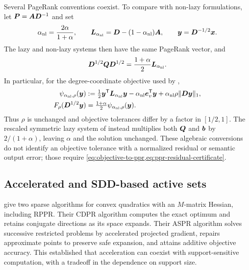 Several PageRank conventions coexist. To compare with non-lazy formulations,
let $\bm{P}=\bm{A}\bm{D}^{-1}$ and set
\begin{equation}
 \alpha_{\mathrm{nl}}=\frac{2\alpha}{1+\alpha},\qquad
 \bm{L}_{\alpha_{\mathrm{nl}}}=\bm{D}-(1-\alpha_{\mathrm{nl}})\bm{A},
 \qquad \bm{y}=\bm{D}^{-1/2}\bm{x}.
 \label{eq:related-nonlazy-map}
\end{equation}
The lazy and non-lazy systems then have the same PageRank vector, and
\begin{equation*}
 \bm{D}^{1/2}\bm{Q}\bm{D}^{1/2}
   =\frac{1+\alpha}{2}\bm{L}_{\alpha_{\mathrm{nl}}}.
\end{equation*}
In particular, for the degree-coordinate objective used by
\citet{wei2026simple,cui2026accelerating},
\begin{equation*}
 \begin{aligned}
 \psi_{\alpha_{\mathrm{nl}},\rho}(\bm{y})
   &:=\tfrac12\bm{y}^{\mathsf{T}}\bm{L}_{\alpha_{\mathrm{nl}}}\bm{y}
      -\alpha_{\mathrm{nl}}\bm{e}_{v}^{\mathsf{T}}\bm{y}
      +\alpha_{\mathrm{nl}}\rho\lVert\bm{D}\bm{y}\rVert_1,\\
 F_\rho(\bm{D}^{1/2}\bm{y})
   &=\tfrac{1+\alpha}{2}\psi_{\alpha_{\mathrm{nl}},\rho}(\bm{y}).
 \end{aligned}
\end{equation*}
Thus $\rho$ is unchanged and objective tolerances differ by a factor in
$[1/2,1]$. The rescaled symmetric lazy system of
\citet{zhou2024iterative} instead multiplies both $\bm{Q}$ and $\bm{b}$ by
$2/(1+\alpha)$, leaving $\alpha$ and the solution unchanged.
These algebraic conversions do not identify an objective tolerance with a
normalized residual or semantic output error; those require
\cref{eq:objective-to-ppr,eq:ppr-residual-certificate}.

\subsection{Accelerated and SDD-based active sets}

\citet{martinezrubio2023accelerated} give two sparse algorithms for convex
quadratics with an $M$-matrix Hessian, including RPPR. Their CDPR algorithm
computes the exact optimum and retains conjugate directions as its space
expands. Their ASPR algorithm solves successive restricted problems by
accelerated projected gradient, repairs approximate points to preserve safe
expansion, and attains additive objective accuracy. This established that
acceleration can coexist with support-sensitive computation, with a
tradeoff in the dependence on support size.

